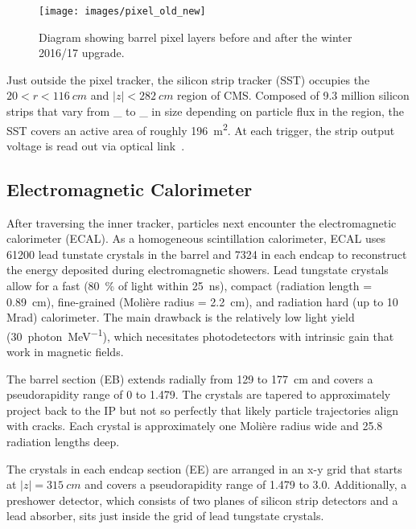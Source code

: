 \documentclass[12pt]{article}
\begin{document}
        \noindent \begin{figure}[htbp] \begin{center}
            \texttt{[image: images/pixel\_old\_new]}
            \caption{Diagram showing barrel pixel layers before and after the winter 2016/17 upgrade.~\cite{pixel_old_new}}
            \label{pixel_old_new}
        \end{center} \end{figure}
        
        Just outside the pixel tracker, the silicon strip tracker (SST) occupies the $\num{20} < r < \SI{116}{cm}$ and $\lvert z \rvert < \SI{282}{cm}$ region of CMS. Composed of \num{9.3} million silicon strips that vary from \_ to \_ in size  depending on particle flux in the region, the SST covers an active area of roughly \SI{196}{m^2}. At each trigger, the strip output voltage is read out via optical link~\cite{cms_pixel_upgrade}.

    \subsection{Electromagnetic Calorimeter}
        After traversing the inner tracker, particles next encounter the electromagnetic calorimeter (ECAL). As a homogeneous scintillation calorimeter, ECAL uses \num{61200} lead tunstate crystals in the barrel and \num{7324} in each endcap to reconstruct the energy deposited during electromagnetic showers. Lead tungstate crystals allow for a fast (\SI{80}{\percent} of light within \SI{25}{ns}), compact (radiation length = \SI{0.89}{cm}), fine-grained (Moli\`ere radius = \SI{2.2}{cm}), and radiation hard (up to 10 Mrad) calorimeter. The main drawback is the relatively low light yield (\SI{30}{photon\per\mega\electronvolt}), which necesitates photodetectors with intrinsic gain that work in magnetic fields\cite{cms_experiment, cms_tdr}.

        The barrel section (EB) extends radially from \num{129} to \SI{177}{cm} and covers a pseudorapidity range of \num{0} to \num{1.479}. The crystals are tapered to approximately project back to the IP but not so perfectly that likely particle trajectories align with cracks. Each crystal is approximately one Moli\`ere radius wide and 25.8 radiation lengths deep.

        The crystals in each endcap section (EE) are arranged in an x-y grid that starts at $\lvert z \rvert = \SI{315}{cm}$ and covers a pseudorapidity range of \num{1.479} to \num{3.0}. Additionally, a preshower detector, which consists of two planes of silicon strip detectors and a lead absorber, sits just inside the grid of lead tungstate crystals. 
\end{document}

